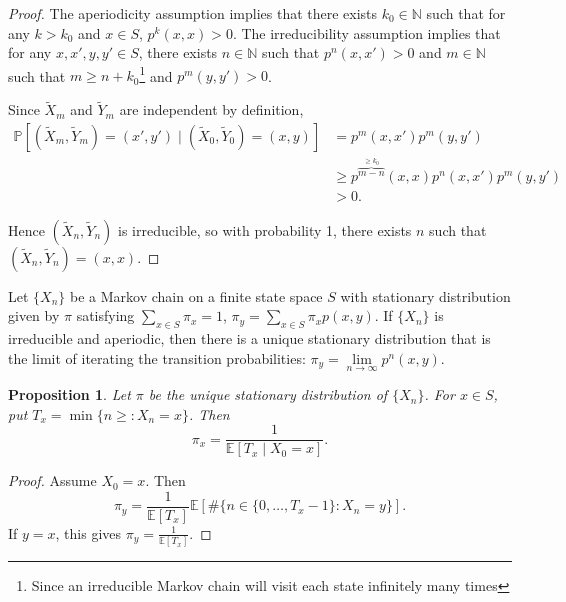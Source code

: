\documentclass{tufte-handout}
\newcommand*\N{\mathbb{N}}
\newcommand*\E{\mathbb{E}}
\renewcommand*\P{\mathbb{P}}
\newtheorem{prop}[thm]{Proposition}
\theoremstyle{definition}
\begin{document}
\begin{proof}
	The aperiodicity assumption implies that there exists $k_0 \in \N$ such that for any $k > k_0$ and $x \in S$, $p^k(x,x) > 0$. The irreducibility assumption implies that for any $x,x',y,y' \in S$, there exists $n \in \N$ such that $p^n(x,x') >0$ and $m \in \N$ such that $m \ge n + k_0$\footnote{Since an irreducible Markov chain will visit each state infinitely many times} and $p^m(y,y') > 0$.

	Since $\tilde{X}_m$ and $\tilde{Y}_m$ are independent by definition, \begin{align*}
		\P\left[\left( \tilde{X}_m, \tilde{Y}_m \right) = \left( x',y' \right) \mid \left( \tilde{X}_0, \tilde{Y}_0 \right) = (x,y)\right] &= p^m(x,x')p^m(y,y') \\
														&\ge p^{\overbrace{m-n}^{\ge k_0}}(x,x)p^{n}(x,x')p^{m}(y,y') \\
														&> 0
	.\end{align*}

	Hence $\left( \tilde{X}_n, \tilde{Y}_n \right)$ is irreducible, so with probability 1, there exists $n$ such that $\left( \tilde{X}_n, \tilde{Y}_n \right) = (x,x)$.
\end{proof}

Let $\{X_n\}$ be a Markov chain on a finite state space $S$ with stationary distribution given by $\pi$ satisfying $\sum\limits_{x \in S}^{} \pi_x = 1$, $\pi_y = \sum\limits_{x \in S}^{} \pi_x p(x,y)$. If $\{X_n\}$ is irreducible and aperiodic, then there is a unique stationary distribution that is the limit of iterating the transition probabilities: $\pi_y = \lim\limits_{n \to \infty} p^n (x,y)$.

\begin{prop}
	Let $\pi$ be the unique stationary distribution of $\{X_n\}$. For $x \in S$, put $T_x = \min \{n \ge : X_n = x\}$. Then \[
		\pi_x = \frac{1}{\E\left[T_x \mid X_0 = x\right]}
	.\] 
\end{prop}
\begin{proof}
	Assume $X_0 = x$. Then \[
		\pi_y = \frac{1}{\E\left[T_x\right]} \E\left[\# \{n \in \{0,\ldots,T_x - 1\} : X_n = y\}\right] 
	.\] If $y=x$, this gives $\pi_y = \frac{1}{\E\left[T_x\right]}$.
\end{proof}
\end{document}

